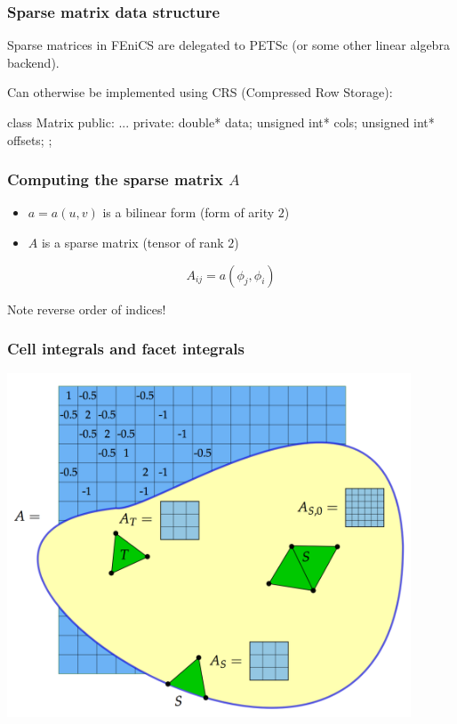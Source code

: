 \documentclass{fenicscourse}
\begin{document}
\begin{frame}[fragile]
  \frametitle{Sparse matrix data structure}

  Sparse matrices in FEniCS are delegated to PETSc (or some
  other linear algebra backend).\\[1em]

  \bigskip

  Can otherwise be implemented using CRS (Compressed Row Storage):

\begin{c++}
class Matrix
{
public:
  ...
private:
   double* data;
   unsigned int* cols;
   unsigned int* offsets;
};
\end{c++}

\end{frame}

\begin{frame}
  \frametitle{Computing the sparse matrix $A$}

  \begin{itemize}
  \item
    $a = a(u, v)$ is a bilinear form (form of arity $2$)
  \item
    $A$ is a sparse matrix (tensor of rank $2$)
  \end{itemize}

  \bigskip

  \begin{equation*}
    A_{ij} = a(\phi_j, \phi_i)
  \end{equation*}

  \bigskip

  Note reverse order of indices!

\end{frame}







\begin{frame}
  \frametitle{Cell integrals and facet integrals}
  \includegraphics[width=0.9\textwidth]{png/assembly_integral_types.png}
\end{frame}
\end{document}
